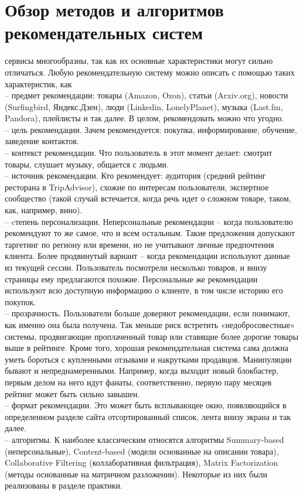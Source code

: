 \documentclass{article}
\newcommand\tab[1][1cm]{\hspace*{#1}}
\begin{document}
\section{Обзор методов и алгоритмов рекомендательных систем}
 сервисы многообразны, так как их основные характеристики могут сильно отличаться. Любую рекомендательную систему можно описать с помощью таких характеристик, как \\
\tab– предмет рекомендации: товары (Amazon, Ozon), статьи (Arxiv.org), новости (Surfingbird, Яндекс.Дзен), люди (Linkedin, LonelyPlanet), музыка (Last.fm, Pandora), плейлисты и так далее. В целом, рекомендовать можно что угодно. \\
\tab– цель рекомендации. Зачем рекомендуется: покупка, информирование, обучение, заведение контактов. \\
\tab– контекст рекомендации. Что пользователь в этот момент делает: смотрит товары, слушает музыку, общается с людьми. \\
\tab– источник рекомендации. Кто рекомендует: аудитория (средний рейтинг ресторана в TripAdvisor), схожие по интересам пользователи, экспертное сообщество (такой случай встечается, когда речь идет о сложном товаре, таком, как, например, вино).\\
\tab– cтепень персонализации. Неперсональные рекомендации – когда пользователю рекомендуют то же самое, что и всем остальным. Такие предложения допускают таргетинг по региону или времени, но не учитывают личные предпочтения клиента. Более продвинутый вариант – когда рекомендации используют данные из текущей сессии. Пользователь посмотрели несколько товаров, и внизу страницы ему предлагаются похожие. Персональные же рекомендации используют всю доступную информацию о клиенте, в том числе историю его покупок.\\
\tab– прозрачность. Пользователи больше доверяют рекомендации, если понимают, как именно она была получена. Так меньше риск встретить «недобросовестные» системы, продвигающие проплаченный товар или ставящие более дорогие товары выше в рейтинге. Кроме того, хорошая рекомендательная система сама должна уметь бороться с купленными отзывами и накрутками продавцов. Манипуляции бывают и непреднамеренными. Например, когда выходит новый блокбастер, первым делом на него идут фанаты, соответственно, первую пару месяцев рейтинг может быть сильно завышен.\\
\tab– формат рекомендации. Это может быть всплывающее окно, появляющийся в определенном разделе сайта отсортированный список, лента внизу экрана и так далее.\\
\tab– алгоритмы. К наиболее классическим относятся алгоритмы Summary-based (неперсональные), Content-based (модели основанные на описании товара), Collaborative Filtering (коллаборативная фильтрация), Matrix Factorization (методы основанные на матричном разложении). Некоторые из них были реализованы в разделе практики.
\newpage
\end{document}
